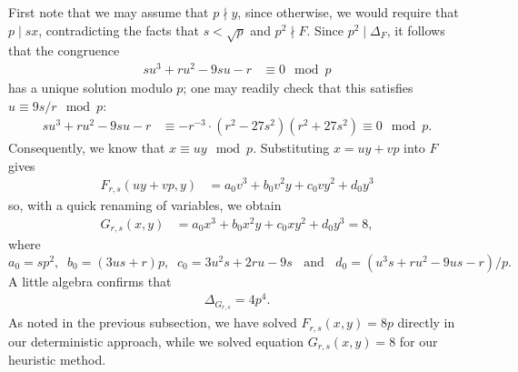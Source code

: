First note that we may assume that $p \nmid y$, since otherwise, we would require that $p \mid sx$, contradicting the facts that $s < \sqrt{p}$ and $p^2 \nmid F$. Since $p^2 \mid \Delta_F$, it follows that the congruence
\begin{align*}
  su^3 +ru^2 -9su - r &\equiv 0 \mod{p}
\end{align*}
has a unique solution modulo $p$; one may readily check that this satisfies $u \equiv 9s/r \mod{p}$:
\begin{align*}
  su^3 +ru^2 -9su - r &\equiv -r^{-3} \cdot (r^2-27s^2)(r^2+27s^2) \equiv 0 \mod{p}.
\end{align*}
Consequently, we know that $x \equiv uy \mod{p}$. Substituting $x = uy + vp$ into $F$ gives
\begin{align*}
F_{r,s}(uy+vp,y) &= a_0 v^3 + b_0 v^2 y + c_0 v y^2 + d_0 y^3
\end{align*}
so, with a quick renaming of variables, we obtain
\begin{align*}
G_{r,s}(x,y) &= a_0 x^3 + b_0 x^2 y + c_0 x y^2 + d_0 y^3 =8,
\end{align*} 
where
$$
a_0 = s p^2, \; \; b_0 = (3 u s+r) p, \; \; 
c_0 = 3 u^2 s+2 r u - 9s \;  \; \mbox{ and } \; \; d_0 = (u^3 s+r u^2 - 9 u s - r)/p.
$$
A little algebra confirms that 
\begin{align*}
\Delta_{G_{r,s}} = 4 p^4.
\end{align*}
As noted in the previous subsection, we have solved $F_{r,s}(x,y)=8p$ directly in our deterministic 
approach, while we solved equation $G_{r,s}(x,y)=8$ for our heuristic method.

